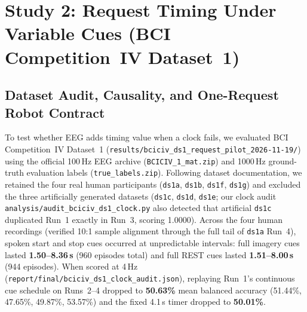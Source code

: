 \documentclass{article}
\begin{document}
\section{Study 2: Request Timing Under Variable Cues (BCI Competition~IV Dataset~1)}
\label{sec:study2}

\subsection{Dataset Audit, Causality, and One-Request Robot Contract}

To test whether EEG adds timing value when a clock fails, we evaluated BCI Competition~IV Dataset~1 (\texttt{results/bciciv\_ds1\_request\_pilot\_2026-11-19/}) using the official 100\,Hz EEG archive (\texttt{BCICIV\_1\_mat.zip}) and 1000\,Hz ground-truth evaluation labels (\texttt{true\_labels.zip}). Following dataset documentation, we retained the four real human participants (\texttt{ds1a}, \texttt{ds1b}, \texttt{ds1f}, \texttt{ds1g}) and excluded the three artificially generated datasets (\texttt{ds1c}, \texttt{ds1d}, \texttt{ds1e}; our clock audit \texttt{analysis/audit\_bciciv\_ds1\_clock.py} also detected that artificial \texttt{ds1c} duplicated Run~1 exactly in Run~3, scoring 1.0000). Across the four human recordings (verified 10:1 sample alignment through the full tail of \texttt{ds1a} Run~4), spoken start and stop cues occurred at unpredictable intervals: full imagery cues lasted \textbf{1.50--8.36\,s} (960 episodes total) and full REST cues lasted \textbf{1.51--8.00\,s} (944 episodes). When scored at 4\,Hz (\texttt{report/final/bciciv\_ds1\_clock\_audit.json}), replaying Run~1's continuous cue schedule on Runs~2--4 dropped to \textbf{50.63\%} mean balanced accuracy (51.44\%, 47.65\%, 49.87\%, 53.57\%) and the fixed 4.1\,s timer dropped to \textbf{50.01\%}.
\end{document}
